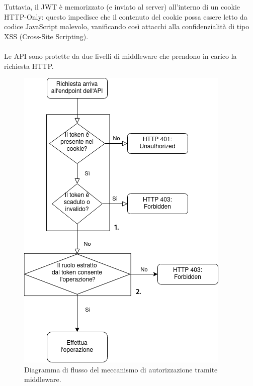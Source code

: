 \documentclass[a4paper, 11pt]{article}
\begin{document}
Tuttavia, il JWT è memorizzato (e inviato al server) all'interno di un cookie HTTP-Only: questo impedisce che il contenuto del cookie possa essere letto da codice JavaScript malevolo, vanificando così attacchi alla confidenzialità di tipo XSS (Cross-Site Scripting).\\\\
Le API sono protette da due livelli di middleware che prendono in carico la richiesta HTTP.
\begin{figure}[H]
    \centering
    \includegraphics[width=\textwidth]{middleware}
    \caption{Diagramma di flusso del meccanismo di autorizzazione tramite middleware.}
\end{figure}
\end{document}
